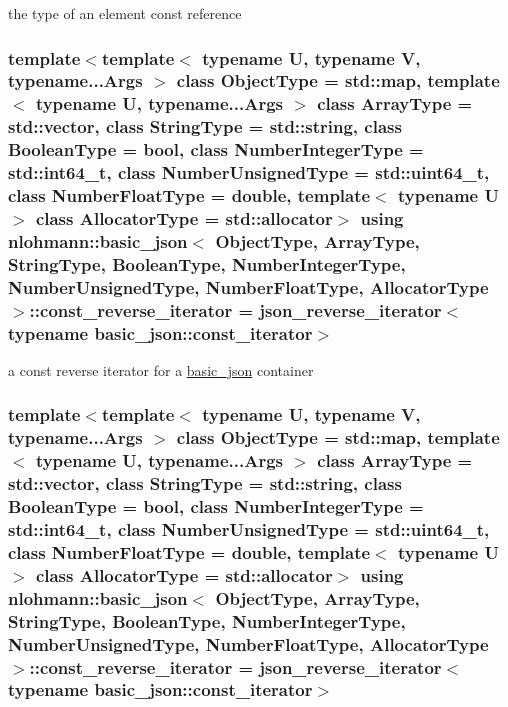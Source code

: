 the type of an element const reference 

\hypertarget{classnlohmann_1_1basic__json_ae336fff01f4b78e3e16e5008dc8dbc00}{
\subsubsection[{const\-\_\-reverse\-\_\-iterator}]{\setlength{\rightskip}{0pt plus 5cm}template$<$template$<$ typename U, typename V, typename...\-Args $>$ class Object\-Type = std\-::map, template$<$ typename U, typename...\-Args $>$ class Array\-Type = std\-::vector, class String\-Type  = std\-::string, class Boolean\-Type  = bool, class Number\-Integer\-Type  = std\-::int64\-\_\-t, class Number\-Unsigned\-Type  = std\-::uint64\-\_\-t, class Number\-Float\-Type  = double, template$<$ typename U $>$ class Allocator\-Type = std\-::allocator$>$ using {\bf nlohmann\-::basic\-\_\-json}$<$ Object\-Type, Array\-Type, String\-Type, Boolean\-Type, Number\-Integer\-Type, Number\-Unsigned\-Type, Number\-Float\-Type, Allocator\-Type $>$\-::{\bf const\-\_\-reverse\-\_\-iterator} =  {\bf json\-\_\-reverse\-\_\-iterator}$<$typename {\bf basic\-\_\-json\-::const\-\_\-iterator}$>$}}\label{classnlohmann_1_1basic__json_ae336fff01f4b78e3e16e5008dc8dbc00}


a const reverse iterator for a \hyperlink{classnlohmann_1_1basic__json}{basic\-\_\-json} container 

\hypertarget{classnlohmann_1_1basic__json_ae336fff01f4b78e3e16e5008dc8dbc00}{
\subsubsection[{const\-\_\-reverse\-\_\-iterator}]{\setlength{\rightskip}{0pt plus 5cm}template$<$template$<$ typename U, typename V, typename...\-Args $>$ class Object\-Type = std\-::map, template$<$ typename U, typename...\-Args $>$ class Array\-Type = std\-::vector, class String\-Type  = std\-::string, class Boolean\-Type  = bool, class Number\-Integer\-Type  = std\-::int64\-\_\-t, class Number\-Unsigned\-Type  = std\-::uint64\-\_\-t, class Number\-Float\-Type  = double, template$<$ typename U $>$ class Allocator\-Type = std\-::allocator$>$ using {\bf nlohmann\-::basic\-\_\-json}$<$ Object\-Type, Array\-Type, String\-Type, Boolean\-Type, Number\-Integer\-Type, Number\-Unsigned\-Type, Number\-Float\-Type, Allocator\-Type $>$\-::{\bf const\-\_\-reverse\-\_\-iterator} =  {\bf json\-\_\-reverse\-\_\-iterator}$<$typename {\bf basic\-\_\-json\-::const\-\_\-iterator}$>$}}\label{classnlohmann_1_1basic__json_ae336fff01f4b78e3e16e5008dc8dbc00}


